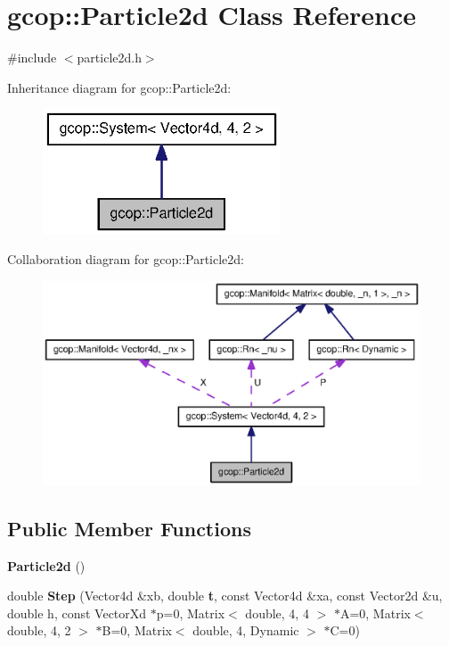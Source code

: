 \section{gcop\-:\-:\-Particle2d \-Class \-Reference}
\label{classgcop_1_1Particle2d}


{\ttfamily \#include $<$particle2d.\-h$>$}



\-Inheritance diagram for gcop\-:\-:\-Particle2d\-:
\nopagebreak
\begin{figure}[H]
\begin{center}
\leavevmode
\includegraphics[width=200pt]{classgcop_1_1Particle2d__inherit__graph}
\end{center}
\end{figure}


\-Collaboration diagram for gcop\-:\-:\-Particle2d\-:
\nopagebreak
\begin{figure}[H]
\begin{center}
\leavevmode
\includegraphics[width=350pt]{classgcop_1_1Particle2d__coll__graph}
\end{center}
\end{figure}
\subsection*{\-Public \-Member \-Functions}
\begin{DoxyCompactItemize}
\item 
{\bf \-Particle2d} ()
\item 
double {\bf \-Step} (\-Vector4d \&xb, double {\bf t}, const \-Vector4d \&xa, const \-Vector2d \&u, double h, const \-Vector\-Xd $\ast$p=0, \-Matrix$<$ double, 4, 4 $>$ $\ast$\-A=0, \-Matrix$<$ double, 4, 2 $>$ $\ast$\-B=0, \-Matrix$<$ double, 4, \-Dynamic $>$ $\ast$\-C=0)
\end{DoxyCompactItemize}
